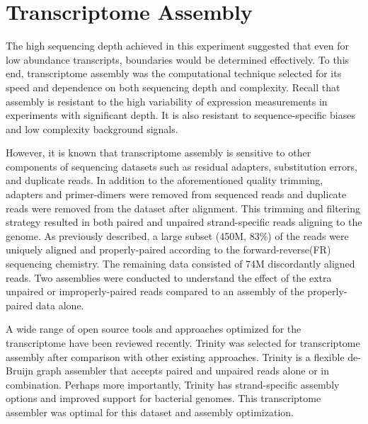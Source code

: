

\chapter{Transcriptome Assembly}
The high sequencing depth achieved in this experiment suggested that even for low abundance transcripts, boundaries would be determined effectively. To this end, transcriptome assembly was the computational technique selected for its speed and dependence on both sequencing depth and complexity.\cite{108} Recall that assembly is resistant to the high variability of expression measurements in experiments with significant depth. It is also resistant to sequence-specific biases and low complexity background signals. 

However, it is known that transcriptome assembly is sensitive to other components of sequencing datasets such as residual adapters, substitution errors, and duplicate reads.\cite{108} In addition to the aforementioned quality trimming, adapters and primer-dimers were removed from sequenced reads and duplicate reads were removed from the dataset after alignment. This trimming and filtering strategy resulted in both paired and unpaired strand-specific reads aligning to the genome. As previously described, a large subset (450M, 83\%) of the reads were uniquely aligned and properly-paired according to the forward-reverse(FR) sequencing chemistry. The remaining data consisted of 74M discordantly aligned reads. Two assemblies were conducted to understand the effect of the extra unpaired or improperly-paired reads compared to an assembly of the properly-paired data alone.

A wide range of open source tools and approaches optimized for the transcriptome have been reviewed recently.\cite{108} Trinity was selected for transcriptome assembly after comparison with other existing approaches. Trinity\cite{58} is a flexible de-Bruijn graph assembler that accepts paired and unpaired reads alone or in combination. Perhaps more importantly, Trinity has strand-specific assembly options and improved support for bacterial genomes. This transcriptome assembler was optimal for this dataset and assembly optimization.







